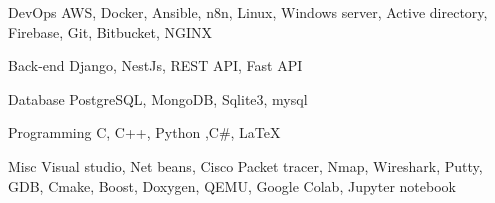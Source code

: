 

\begin{cvskills}

  
  \cvskill
    {DevOps} %
    {AWS, Docker, Ansible, n8n, Linux, Windows server, Active directory, Firebase, Git, Bitbucket, NGINX} %

  
  \cvskill
    {Back-end} %
    {Django, NestJs, REST API, Fast API} %


  \cvskill
    {Database} %
    {PostgreSQL, MongoDB, Sqlite3, mysql} %


  \cvskill
    {Programming} %
    {C, C++, Python ,C#, LaTeX} %


  \cvskill
    {Misc} %
    {Visual studio, Net beans, Cisco Packet tracer, Nmap, Wireshark, Putty, GDB, Cmake, Boost, Doxygen, QEMU, Google Colab, Jupyter notebook} %


\end{cvskills}
